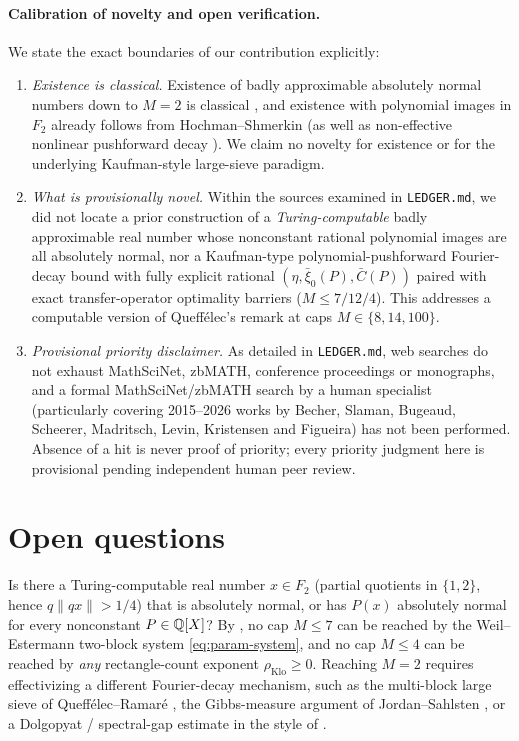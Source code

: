 \documentclass[11pt]{article}
\newcommand{\dist}[1]{\lVert #1\rVert}
\newcommand{\ttt}[1]{\texttt{\begingroup\def\_{\textunderscore\discretionary{}{}{}}#1\endgroup}}
\newcommand{\rhoK}{\rho_{\mathrm{Klo}}}
\begin{document}
\paragraph{Calibration of novelty and open verification.}
We state the exact boundaries of our contribution explicitly:
\begin{enumerate}[label=\textup{(\arabic*)},nosep]
\item \emph{Existence is classical.} Existence of badly approximable absolutely normal numbers down to $M=2$ is classical \cite{Kaufman1980,Montgomery1994,QueffelecRamare2003}, and existence with polynomial images in $F_2$ already follows from Hochman--Shmerkin \cite[Theorems~1.4, 1.5, 1.12 and \S1.3.3]{HochmanShmerkin2015} (as well as non-effective nonlinear pushforward decay \cite{BakerBanaji2025,ARHW2026}). We claim no novelty for existence or for the underlying Kaufman-style large-sieve paradigm.
\item \emph{What is provisionally novel.} Within the sources examined in \ttt{LEDGER.md}, we did not locate a prior construction of a \emph{Turing-computable} badly approximable real number whose nonconstant rational polynomial images are all absolutely normal, nor a Kaufman-type polynomial-pushforward Fourier-decay bound with fully explicit rational $(\eta,\bar\xi_0(P),\bar C(P))$ paired with exact transfer-operator optimality barriers ($M\le7/12/4$). This addresses a computable version of Queff\'elec's \cite{Queffelec2006} remark at caps $M\in\{8,14,100\}$.
\item \emph{Provisional priority disclaimer.} As detailed in \ttt{LEDGER.md}, web searches do not exhaust MathSciNet, zbMATH, conference proceedings or monographs, and a formal MathSciNet/zbMATH search by a human specialist (particularly covering 2015--2026 works by Becher, Slaman, Bugeaud, Scheerer, Madritsch, Levin, Kristensen and Figueira) has not been performed. Absence of a hit is never proof of priority; every priority judgment here is provisional pending independent human peer review.
\end{enumerate}

\section{Open questions}\label{sec:questions}

\begin{question}[Lowering the computable cap to $M=2$]\label{q:cap2}
Is there a Turing-computable real number $x\in F_2$ (partial quotients in $\{1,2\}$, hence $q\dist{qx}>1/4$) that is absolutely normal, or has $P(x)$ absolutely normal for every nonconstant $P\in\mathbb Q[X]$? By , no cap $M\le7$ can be reached by the Weil--Estermann two-block system \eqref{eq:param-system}, and no cap $M\le4$ can be reached by \emph{any} rectangle-count exponent $\rhoK\ge0$. Reaching $M=2$ requires effectivizing a different Fourier-decay mechanism, such as the multi-block large sieve of Queff\'elec--Ramar\'e \cite{QueffelecRamare2003}, the Gibbs-measure argument of Jordan--Sahlsten \cite{JordanSahlsten2016}, or a Dolgopyat / spectral-gap estimate in the style of \cite{SahlstenStevens2024,BakerBanaji2025,ARHW2026}.
\end{question}
\end{document}
